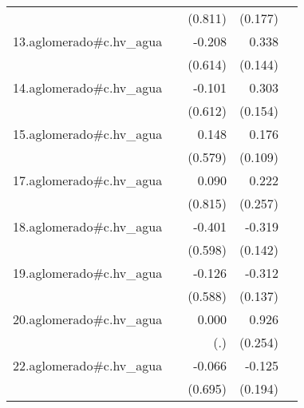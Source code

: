 {\begin{longtable}{l*{4}{D{.}{.}{-1}}}
            &                     &     (0.811)         &     (0.177)         &                     \\
\addlinespace
13.aglomerado#c.hv\_agua&                     &      -0.208         &       0.338\sym{*}  &                     \\
            &                     &     (0.614)         &     (0.144)         &                     \\
\addlinespace
14.aglomerado#c.hv\_agua&                     &      -0.101         &       0.303\sym{*}  &                     \\
            &                     &     (0.612)         &     (0.154)         &                     \\
\addlinespace
15.aglomerado#c.hv\_agua&                     &       0.148         &       0.176         &                     \\
            &                     &     (0.579)         &     (0.109)         &                     \\
\addlinespace
17.aglomerado#c.hv\_agua&                     &       0.090         &       0.222         &                     \\
            &                     &     (0.815)         &     (0.257)         &                     \\
\addlinespace
18.aglomerado#c.hv\_agua&                     &      -0.401         &      -0.319\sym{*}  &                     \\
            &                     &     (0.598)         &     (0.142)         &                     \\
\addlinespace
19.aglomerado#c.hv\_agua&                     &      -0.126         &      -0.312\sym{*}  &                     \\
            &                     &     (0.588)         &     (0.137)         &                     \\
\addlinespace
20.aglomerado#c.hv\_agua&                     &       0.000         &       0.926\sym{***}&                     \\
            &                     &         (.)         &     (0.254)         &                     \\
\addlinespace
22.aglomerado#c.hv\_agua&                     &      -0.066         &      -0.125         &                     \\
            &                     &     (0.695)         &     (0.194)         &                     \\

\end{longtable}}
